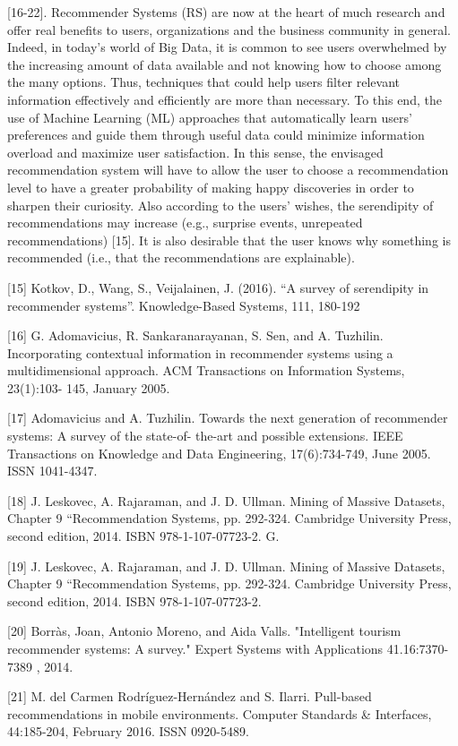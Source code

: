 [16-22]. Recommender Systems (RS) are now at the heart of
much research and offer real benefits to users, organizations and the business community in
general. Indeed, in today’s world of Big Data, it is common to see users overwhelmed by the
increasing amount of data available and not knowing how to choose among the many options.
Thus, techniques that could help users filter relevant information effectively and efficiently are
more than necessary. To this end, the use of Machine Learning (ML) approaches that
automatically learn users’ preferences and guide them through useful data could minimize
information overload and maximize user satisfaction. In this sense, the envisaged
recommendation system will have to allow the user to choose a recommendation level to have a
greater probability of making happy discoveries in order to sharpen their curiosity. Also
according to the users’ wishes, the serendipity of recommendations may increase (e.g., surprise
events, unrepeated recommendations) [15]. It is also desirable that the user knows why
something is recommended (i.e., that the recommendations are explainable).

[15] Kotkov, D., Wang, S., Veijalainen, J. (2016). “A survey of serendipity in recommender systems”.
Knowledge-Based Systems, 111, 180-192

[16] G. Adomavicius, R. Sankaranarayanan, S. Sen, and A. Tuzhilin. Incorporating contextual information in
recommender systems using a multidimensional approach. ACM Transactions on Information Systems, 23(1):103-
145, January 2005.

[17] Adomavicius and A. Tuzhilin. Towards the next generation of recommender systems: A survey of the state-of-
the-art and possible extensions. IEEE Transactions on Knowledge and Data Engineering, 17(6):734-749, June 2005.
ISSN 1041-4347.

[18] J. Leskovec, A. Rajaraman, and J. D. Ullman. Mining of Massive Datasets, Chapter 9 “Recommendation
Systems, pp. 292-324. Cambridge University Press, second edition, 2014. ISBN 978-1-107-07723-2. G.

[19] J. Leskovec, A. Rajaraman, and J. D. Ullman. Mining of Massive Datasets, Chapter 9 “Recommendation
Systems, pp. 292-324. Cambridge University Press, second edition, 2014. ISBN 978-1-107-07723-2.

[20] Borràs, Joan, Antonio Moreno, and Aida Valls. "Intelligent tourism recommender systems: A survey." Expert
Systems with Applications 41.16:7370-7389 , 2014.

[21] M. del Carmen Rodríguez-Hernández and S. Ilarri. Pull-based recommendations in mobile environments.
Computer Standards \& Interfaces, 44:185-204, February 2016. ISSN 0920-5489.

